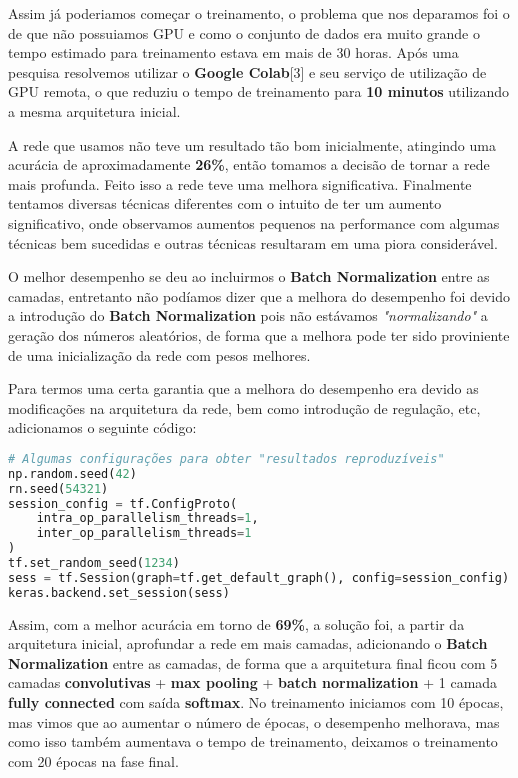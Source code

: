 Assim já poderiamos começar o treinamento, o problema que nos deparamos
foi o de que não possuiamos GPU e como o conjunto de dados era muito
grande o tempo estimado para treinamento estava em mais de 30 horas.
Após uma pesquisa resolvemos utilizar o \textbf{Google Colab}[3] e seu
serviço de utilização de GPU remota, o que reduziu o tempo de
treinamento para \textbf{10 minutos} utilizando a mesma arquitetura
inicial.

A rede que usamos não teve um resultado tão bom inicialmente, atingindo uma
acurácia de aproximadamente \textbf{26\%}, então tomamos a decisão de tornar a
rede mais profunda. Feito isso a rede teve uma melhora significativa.
Finalmente tentamos diversas técnicas diferentes com o intuito de ter um aumento
significativo, onde observamos aumentos pequenos na performance com algumas
técnicas bem sucedidas e outras técnicas resultaram em uma piora considerável.

O melhor desempenho se deu ao incluirmos o \textbf{Batch Normalization} entre as
camadas, entretanto não podíamos dizer que a melhora do desempenho foi devido a
introdução do \textbf{Batch Normalization} pois não estávamos
\emph{"normalizando"} a geração dos números aleatórios, de forma que a
melhora pode ter sido proviniente de uma inicialização da rede com pesos
melhores.

Para termos uma certa garantia que a melhora do desempenho era devido as
modificações na arquitetura da rede, bem como introdução de regulação,
etc, adicionamos o seguinte código:

\begin{lstlisting}[language=Python]
# Algumas configurações para obter "resultados reproduzíveis"
np.random.seed(42)
rn.seed(54321)
session_config = tf.ConfigProto(
    intra_op_parallelism_threads=1,
    inter_op_parallelism_threads=1
)
tf.set_random_seed(1234)
sess = tf.Session(graph=tf.get_default_graph(), config=session_config)
keras.backend.set_session(sess)
\end{lstlisting}

Assim, com a melhor acurácia em torno de \textbf{69\%}, a solução
foi, a partir da arquitetura inicial, aprofundar a rede em mais camadas,
adicionando o \textbf{Batch Normalization} entre as camadas, de forma
que a arquitetura final ficou com 5 camadas \textbf{convolutivas} +
\textbf{max pooling} + \textbf{batch normalization} + 1 camada
\textbf{fully connected} com saída \textbf{softmax}. No treinamento
iniciamos com 10 épocas, mas vimos que ao aumentar o número de épocas, o
desempenho melhorava, mas como isso também aumentava o tempo de
treinamento, deixamos o treinamento com 20 épocas na fase final.

